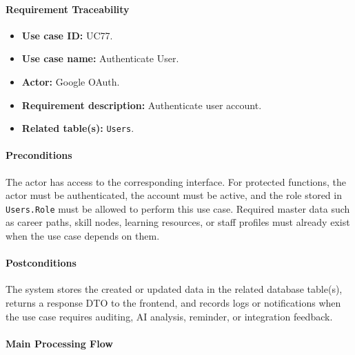 \paragraph{Requirement Traceability}

\begin{itemize}
    \item \textbf{Use case ID:} UC77.
    \item \textbf{Use case name:} Authenticate User.
    \item \textbf{Actor:} Google OAuth.
    \item \textbf{Requirement description:} Authenticate user account.
    \item \textbf{Related table(s):} \texttt{Users}.
\end{itemize}

\paragraph{Preconditions}

The actor has access to the corresponding interface. For protected functions, the actor must be authenticated, the account must be active, and the role stored in \texttt{Users.Role} must be allowed to perform this use case. Required master data such as career paths, skill nodes, learning resources, or staff profiles must already exist when the use case depends on them.

\paragraph{Postconditions}

The system stores the created or updated data in the related database table(s), returns a response DTO to the frontend, and records logs or notifications when the use case requires auditing, AI analysis, reminder, or integration feedback.

\paragraph{Main Processing Flow}

